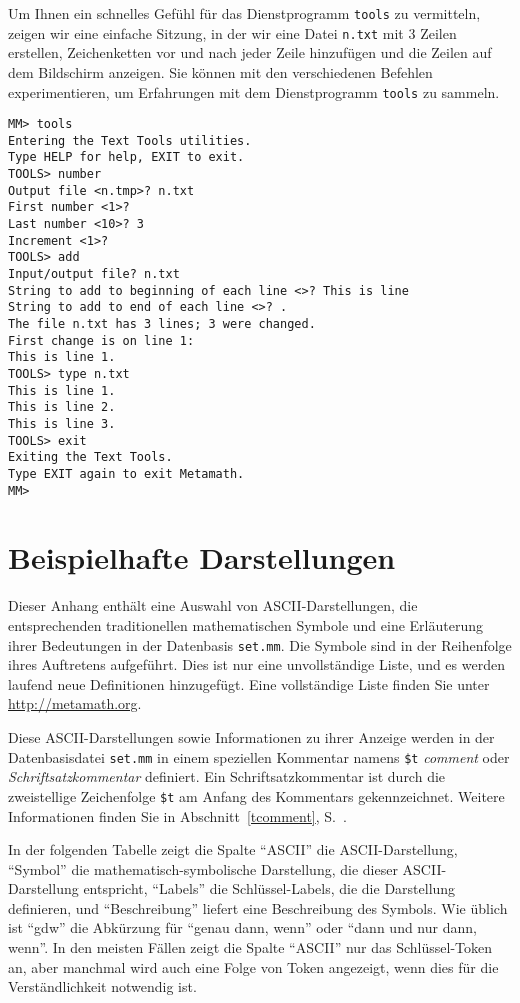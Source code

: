 Um Ihnen ein schnelles Gefühl für das Dienstprogramm \texttt{tools} zu vermitteln, zeigen wir eine einfache Sitzung, in der wir eine Datei \texttt{n.txt} mit 3 Zeilen erstellen, Zeichenketten vor und nach jeder Zeile hinzufügen und die Zeilen auf dem Bildschirm anzeigen. Sie können mit den verschiedenen Befehlen experimentieren, um Erfahrungen mit dem Dienstprogramm \texttt{tools} zu sammeln.

\begin{verbatim}
MM> tools
Entering the Text Tools utilities.
Type HELP for help, EXIT to exit.
TOOLS> number
Output file <n.tmp>? n.txt
First number <1>?
Last number <10>? 3
Increment <1>?
TOOLS> add
Input/output file? n.txt
String to add to beginning of each line <>? This is line
String to add to end of each line <>? .
The file n.txt has 3 lines; 3 were changed.
First change is on line 1:
This is line 1.
TOOLS> type n.txt
This is line 1.
This is line 2.
This is line 3.
TOOLS> exit
Exiting the Text Tools.
Type EXIT again to exit Metamath.
MM>
\end{verbatim}



\appendix
\chapter{Beispielhafte Darstellungen}
\label{ASCII}

Dieser Anhang enthält eine Auswahl von {\sc ASCII}-Darstellungen, die ent\-spre\-chen\-den traditionellen mathematischen Symbole und eine Erläuterung ihrer Bedeutungen in der Datenbasis \texttt{set.mm}. Die Symbole sind in der Reihenfolge ihres Auftretens aufgeführt. Dies ist nur eine unvollständige Liste, und es werden laufend neue Definitionen hinzugefügt. Eine vollständige Liste finden Sie unter \url{http://metamath.org}.

Diese {\sc ASCII}-Darstellungen sowie Informationen zu ihrer Anzeige werden in der Datenbasisdatei \texttt{set.mm} in einem speziellen Kommentar namens \texttt{\$t} {\em comment} oder {\em Schriftsatzkommentar} definiert. Ein Schriftsatzkommentar ist durch die zweistellige Zeichenfolge \texttt{\$t} am Anfang des Kommentars gekennzeichnet. Weitere Informationen finden Sie in Abschnitt~\ref{tcomment}, S.~\pageref{tcomment}.

In der folgenden Tabelle zeigt die Spalte "`{\sc ASCII}"' die {\sc ASCII}-Darstellung, "`Symbol"' die mathematisch-symbolische Darstellung, die dieser {\sc ASCII}-Dar\-stel\-lung entspricht, "`Labels"' die Schlüssel-Labels, die die Darstellung de\-fi\-nie\-ren, und "`Beschreibung"' liefert eine Beschreibung des Symbols. Wie üblich ist "`gdw"' die Abkürzung für "`genau dann, wenn"' oder "`dann und nur dann, wenn"'.  In den meisten Fällen zeigt die Spalte "`{\sc ASCII}"' nur das Schlüssel-Token an, aber manchmal wird auch eine Folge von Token angezeigt, wenn dies für die Verständlichkeit notwendig ist.

